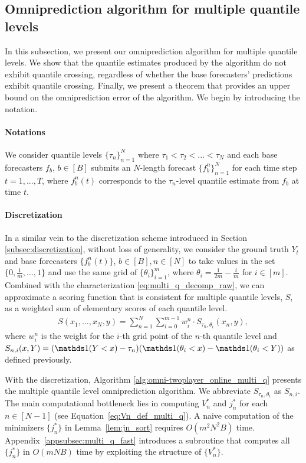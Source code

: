 \subsection{Omniprediction algorithm for multiple quantile levels} \label{subsec:omni_multi_q}
In this subsection, we present our omniprediction algorithm for multiple quantile levels. We show that the quantile estimates produced by the algorithm do not exhibit quantile crossing, regardless of whether the base forecasters' predictions exhibit quantile crossing. Finally, we present a theorem that provides an upper bound on the omniprediction error of the algorithm. We begin by introducing the notation.

\paragraph{Notations}
We consider quantile levels $\{\tau_n\}_{n=1}^N$ where $\tau_1 < \tau_2 < ... < \tau_N$ and each base forecasters $f_b$, $b \in [B]$ submits an $N$-length forecast $\{f_b^n\}_{n=1}^N$ for each time step $t=1, ..., T$, where $f_b^n(t)$ corresponds to the $\tau_n$-level quantile estimate from $f_b$ at time $t$.

\paragraph{Discretization}
In a similar vein to the discretization scheme introduced in Section \ref{subsec:discretization}, without loss of generality, we consider the ground truth $Y_t$ and base forecasters $\{f_b^n(t)\}$, $b \in [B], n \in [N]$ to take values in the set $\{0, \frac{1}{m}, ..., 1\}$ and use the same grid of $\{\theta_i\}_{i=1}^{m}$, where $\theta_i = \frac{1}{2m} - \frac{i}{m}$ for $i \in [m]$. Combined with the characterization \eqref{eq:multi_q_decomp_raw}, we can approximate a scoring function that is consistent for multiple quantile levels, $S$, as a weighted sum of elementary scores of each quantile level.
\begin{align*} %
  S(x_1, \ldots, x_N, y) = \sum_{n=1}^{N} \sum_{i=0}^{m-1} w_i^n \cdot S_{\tau_n, \theta_i}(x_n, y),
\end{align*}
where $w_i^n$ is the weight for the $i$-th grid point of the $n$-th quantile level and $S_{n, i}(x, Y) = (\one(Y < x)-\tau_n)(\one(\theta_i<x)-\one(\theta_i<Y))$ as defined previously.

With the discretization, Algorithm \ref{alg:omni-twoplayer_online_multi_q} presents the multiple quantile level omniprediction algorithm. We abbreviate $S_{\tau_n, \theta_i}$ as $S_{n, i}$. The main computational bottleneck lies in computing $V_n^*$ and $j_n^*$ for each $n \in [N-1]$ (see Equation~\ref{eq:Vn_def_multi_q}). A naive computation of the minimizers $\{j_n^*\}$ in Lemma~\ref{lem:jn_sort} requires $O(m^2 N^2 B)$ time. Appendix~\ref{appsubsec:multi_q_fast} introduces a subroutine that computes all $\{j_n^*\}$ in $O(mNB)$ time by exploiting the structure of $\{V_n^*\}$.


